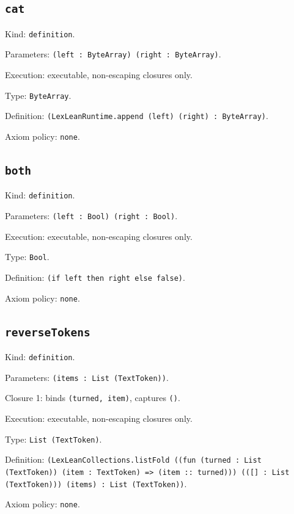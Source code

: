 \documentclass[11pt]{article}
\begin{document}
\subsection*{\texttt{cat}}
\noindent Kind: \texttt{definition}.\par
\noindent Parameters: \texttt{(left : ByteArray) (right : ByteArray)}.\par
\noindent Execution: executable, non-escaping closures only.\par
\noindent Type: \texttt{ByteArray}.\par
\noindent Definition: \texttt{(LexLeanRuntime.append (left) (right) : ByteArray)}.\par
\noindent Axiom policy: \texttt{none}.\par
\subsection*{\texttt{both}}
\noindent Kind: \texttt{definition}.\par
\noindent Parameters: \texttt{(left : Bool) (right : Bool)}.\par
\noindent Execution: executable, non-escaping closures only.\par
\noindent Type: \texttt{Bool}.\par
\noindent Definition: \texttt{(if left then right else false)}.\par
\noindent Axiom policy: \texttt{none}.\par
\subsection*{\texttt{reverseTokens}}
\noindent Kind: \texttt{definition}.\par
\noindent Parameters: \texttt{(items : List (TextToken))}.\par
\noindent Closure 1: binds \texttt{(turned, item)}, captures \texttt{()}.\par
\noindent Execution: executable, non-escaping closures only.\par
\noindent Type: \texttt{List (TextToken)}.\par
\noindent Definition: \texttt{(LexLeanCollections.listFold ((fun (turned : List (TextToken)) (item : TextToken) => (item :: turned))) (([] : List (TextToken))) (items) : List (TextToken))}.\par
\noindent Axiom policy: \texttt{none}.\par
\end{document}
